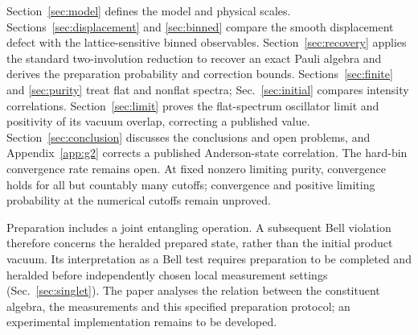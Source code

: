 \documentclass[11pt,a4paper]{article}
\begin{document}
Section~\ref{sec:model} defines the model and physical scales. Sections~\ref{sec:displacement} and \ref{sec:binned} compare the smooth displacement defect with the lattice-sensitive binned observables. Section~\ref{sec:recovery} applies the standard two-involution reduction \cite{Masanes2005,Kaniewski2016} to recover an exact Pauli algebra and derives the preparation probability and correction bounds. Sections~\ref{sec:finite} and \ref{sec:purity} treat flat and nonflat spectra; Sec.~\ref{sec:initial} compares intensity correlations. Section~\ref{sec:limit} proves the flat-spectrum oscillator limit and positivity of its vacuum overlap, correcting a published value. Section~\ref{sec:conclusion} discusses the conclusions and open problems, and Appendix~\ref{app:g2} corrects a published Anderson-state correlation. The hard-bin convergence rate remains open. At fixed nonzero limiting purity, convergence holds for all but countably many cutoffs; convergence and positive limiting probability at the numerical cutoffs remain unproved.

Preparation includes a joint entangling operation. A subsequent Bell violation therefore concerns the heralded prepared state, rather than the initial product vacuum. Its interpretation as a Bell test requires preparation to be completed and heralded before independently chosen local measurement settings (Sec.~\ref{sec:singlet}). The paper analyses the relation between the constituent algebra, the measurements and this specified preparation protocol; an experimental implementation remains to be developed.
\end{document}
